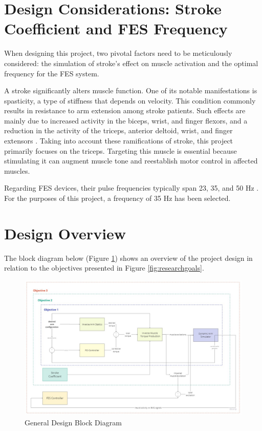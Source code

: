 \section{Design Considerations: Stroke Coefficient and FES Frequency} \label{sec:design considerations}

When designing this project, two pivotal factors need to be meticulously considered: the simulation of stroke's effect on muscle activation and the optimal frequency for the FES system.

A stroke significantly alters muscle function. One of its notable manifestations is spasticity, a type of stiffness that depends on velocity. This condition commonly results in resistance to arm extension among stroke patients. Such effects are mainly due to increased activity in the biceps, wrist, and finger flexors, and a reduction in the activity of the triceps, anterior deltoid, wrist, and finger extensors \cite{IOL}. Taking into account these ramifications of stroke, this project primarily focuses on the triceps. Targeting this muscle is essential because stimulating it can augment muscle tone and reestablish motor control in affected muscles.

Regarding FES devices, their pulse frequencies typically span 23, 35, and 50 Hz \cite{NNPID}. For the purposes of this project, a frequency of 35 Hz has been selected.

\section{Design Overview}
The block diagram below (Figure \ref{fig:bdd}) shows an overview of the project design in relation to the objectives presented in Figure \ref{fig:researchgoals}.

\begin{figure}[h!]
    \centering
    \includegraphics[width=\textwidth]{Pictures/blockDiagram.jpg}
    \caption{General Design Block Diagram}
    \label{fig:bdd}
\end{figure}

